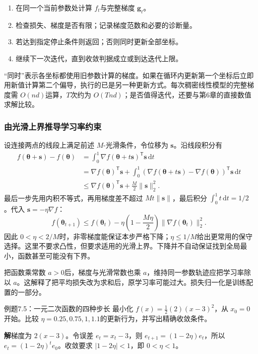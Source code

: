 \documentclass[UTF8,fontset=none,zihao=-4,a4paper]{ctexart}
\newcommand{\sol}{\par\noindent\textbf{解}\quad}
\numberwithin{equation}{section}
\numberwithin{figure}{section}
\begin{document}
\begin{enumerate}
\item 在同一个当前参数处计算 $f_t$与完整梯度 $\symbf g_t$。
\item 检查损失、梯度是否有限；记录梯度范数和必要的诊断量。
\item 若达到指定停止条件则返回；否则同时更新全部坐标。
\item 继续下一次迭代，直到收敛判据成立或到达迭代上限。
\end{enumerate}
“同时”表示各坐标都使用旧参数计算的梯度。如果在循环内更新第一个坐标后立即用新值计算第二个偏导，执行的已是另一种更新方式。每次稠密线性模型的完整梯度需 $O(nd)$运算，$T$次约为 $O(Tnd)$；是否值得迭代，还要与第6章的直接数值求解比较。

\subsubsection{由光滑上界推导学习率约束}
设连接两点的线段上满足前述 $M$-光滑条件，令位移为 $\symbf s$。沿线段积分有
\begin{align*}
 f(\symbf\theta+\symbf s)-f(\symbf\theta)
 &=\int_0^1\nabla f(\symbf\theta+t\symbf s)^{\mathsf T}\symbf s\,\mathrm dt\\
 &=\nabla f(\symbf\theta)^{\mathsf T}\symbf s
 +\int_0^1(\nabla f(\symbf\theta+t\symbf s)-\nabla f(\symbf\theta))^{\mathsf T}\symbf s\,\mathrm dt\\
 &\le\nabla f(\symbf\theta)^{\mathsf T}\symbf s+\frac M2\|\symbf s\|_2^2.
\end{align*}
最后一步先用内积不等式，再用梯度差不超过 $Mt\|\symbf s\|$，最后积分 $\int_0^1t\,\mathrm dt=1/2$。代入 $\symbf s=-\eta\nabla f$：
\[
 f(\symbf\theta_{t+1})
 \le f(\symbf\theta_t)-\eta\left(1-\frac{M\eta}{2}\right)\|\nabla f(\symbf\theta_t)\|_2^2.
\]
因此 $0<\eta<2/M$时，非零梯度能保证本步严格下降；$\eta\le1/M$给出更常用的保守选择。这里不要求凸性，但要求适用的光滑上界。下降并不自动保证找到全局最小，函数甚至可能没有下界。

把函数乘常数 $a>0$后，梯度与光滑常数也乘 $a$，维持同一参数轨迹应把学习率除以 $a$。这解释了把平均损失改为求和后，原学习率可能过大。损失归一化是训练配置的一部分。

\begin{infobox}{例题7.5：一元二次函数的四种步长}
最小化 $f(x)=\frac12(2)(x-3)^2$，从 $x_0=0$开始。比较 $\eta=0.25,0.75,1,1.1$的更新行为，并写出精确收敛条件。
\end{infobox}
\sol 梯度为 $2(x-3)$。令误差 $e_t=x_t-3$，则 $e_{t+1}=(1-2\eta)e_t$，所以 $e_t=(1-2\eta)^t e_0$。收敛要求 $|1-2\eta|<1$，即 $0<\eta<1$。
\end{document}
